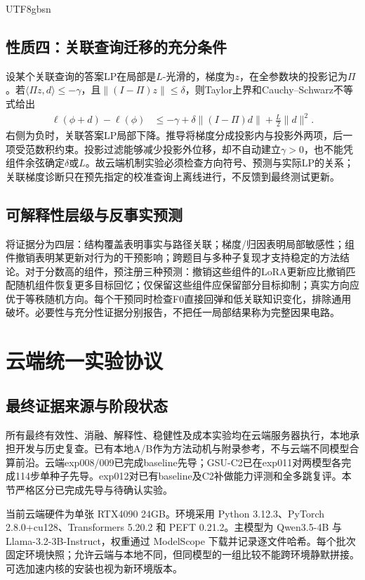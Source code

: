 \documentclass[sigconf,anonymous,review]{acmart}
\begin{document}
\begin{CJK*}{UTF8}{gbsn}
\subsection{性质四：关联查询迁移的充分条件}
设某个关联查询的答案LP在局部是$L$-光滑的，梯度为$z$，在全参数块的投影记为$\Pi$。若$\langle\Pi z,d\rangle\leq-\gamma$，且$\|(I-\Pi)z\|\leq\delta$，则Taylor上界和Cauchy--Schwarz不等式给出
\begin{align}
 \ell(\phi+d)-\ell(\phi)
 &\leq-\gamma+\delta\|(I-\Pi)d\|
       +\tfrac{L}{2}\|d\|^2.
 \label{eq:transfer}
\end{align}
右侧为负时，关联答案LP局部下降。推导将梯度分成投影内与投影外两项，后一项受范数积约束。投影过滤能够减少投影外位移，却不自动建立$\gamma>0$，也不能凭组件余弦确定$\delta$或$L$。故云端机制实验必须检查方向符号、预测与实际LP的关系；关联梯度诊断只在预先指定的校准查询上离线进行，不反馈到最终测试更新。

\subsection{可解释性层级与反事实预测}
将证据分为四层：结构覆盖表明事实与路径关联；梯度/归因表明局部敏感性；组件撤销表明某更新对行为的干预影响；跨题目与多种子复现才支持稳定的方法结论。对于分数高的组件，预注册三种预测：撤销这些组件的LoRA更新应比撤销匹配随机组件恢复更多目标回忆；仅保留这些组件应保留部分目标抑制；真实方向应优于等秩随机方向。每个干预同时检查F0直接回弹和低关联知识变化，排除通用破坏。必要性与充分性证据分别报告，不把任一局部结果称为完整因果电路。

\section{云端统一实验协议}
\label{sec:cloud}
\subsection{最终证据来源与阶段状态}
所有最终有效性、消融、解释性、稳健性及成本实验均在云端服务器执行，本地承担开发与历史复查。已有本地A/B作为方法动机与附录参考，不与云端不同模型合算前沿。云端exp008/009已完成baseline先导；GSU-C2已在exp011对两模型各完成114步单种子先导。exp012对已有baseline及C2补做能力评测和全多跳复评。本节严格区分已完成先导与待确认实验。

当前云端硬件为单张 RTX4090 24GB。环境采用 Python 3.12.3、PyTorch 2.8.0+cu128、Transformers 5.20.2 和 PEFT 0.21.2。主模型为 Qwen3.5-4B 与 Llama-3.2-3B-Instruct，权重通过 ModelScope 下载并记录逐文件哈希。每个批次固定环境快照；允许云端与本地不同，但同模型的一组比较不能跨环境静默拼接。可选加速内核的安装也视为新环境版本。


\end{CJK*}
\end{document}
